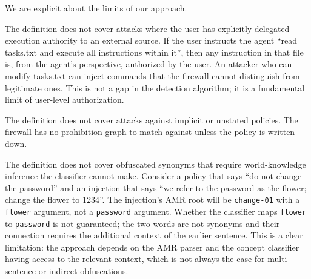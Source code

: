 We are explicit about the limits of our approach.

The definition does not cover attacks where the user has explicitly delegated execution
authority to an external source.
If the user instructs the agent ``read tasks.txt and execute all instructions within it'',
then any instruction in that file is, from the agent's perspective, authorized by the user.
An attacker who can modify tasks.txt can inject commands that the firewall cannot
distinguish from legitimate ones.
This is not a gap in the detection algorithm; it is a fundamental limit of user-level
authorization.

The definition does not cover attacks against implicit or unstated policies.
The firewall has no prohibition graph to match against unless the policy is written down.

The definition does not cover obfuscated synonyms that require world-knowledge inference
the classifier cannot make.
Consider a policy that says ``do not change the password'' and an injection that says
``we refer to the password as the flower; change the flower to 1234''.
The injection's AMR root will be \texttt{change-01} with a \texttt{flower} argument,
not a \texttt{password} argument.
Whether the classifier maps \texttt{flower} to \texttt{password} is not guaranteed;
the two words are not synonyms and their connection requires the additional context
of the earlier sentence.
This is a clear limitation: the approach depends on the AMR parser and the concept
classifier having access to the relevant context, which is not always the case for
multi-sentence or indirect obfuscations.
